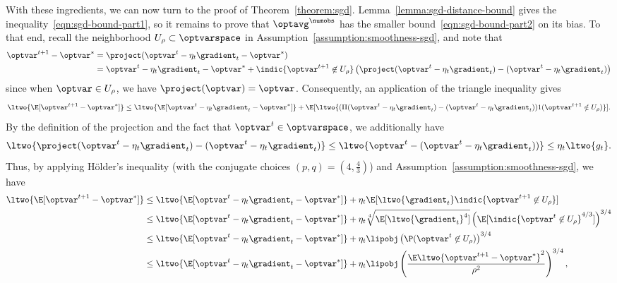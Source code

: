 \documentclass[11pt,twoside]{article}
\theoremstyle{definition}
\begin{document}
\vspace*{.1in}

With these ingredients, we can now turn to the proof of
Theorem~\ref{theorem:sgd}.  Lemma~\ref{lemma:sgd-distance-bound} gives
the inequality~\eqref{eqn:sgd-bound-part1}, so it remains to prove
that $\optavg^\numobs$ has the smaller
bound~\eqref{eqn:sgd-bound-part2} on its bias. To that end, recall the
neighborhood $U_\rho \subset \optvarspace$ in
Assumption~\ref{assumption:smoothness-sgd}, and note that
\begin{align*}
  \optvar^{t + 1} - \optvar^*
  & = \project(\optvar^t - \eta_t \gradient_t - \optvar^*) \\
  & = \optvar^t - \eta_t \gradient_t - \optvar^*
  + \indic{\optvar^{t+1} \not\in U_\rho}
  \left(\project(\optvar^t - \eta_t \gradient_t)
  - (\optvar^t - \eta_t \gradient_t)\right)
\end{align*}
since when $\optvar \in U_\rho$, we have $\project(\optvar) = \optvar$.
Consequently, an application of the triangle inequality gives
\begin{equation*}
  \ltwo{\E[\optvar^{t+1}-\optvar^*]}
  \leq \ltwo{\E[\optvar^{t}-\eta_t\gradient_t-\optvar^*]}
  + \E[\ltwo{(\Pi(\optvar^{t}-\eta_t\gradient_t)
      -(\optvar^{t}-\eta_t\gradient_t))1(\optvar^{t+1}\notin U_\rho)}].
\end{equation*}
By the definition of the projection and the fact that $\optvar^t \in
\optvarspace$, we additionally have
\begin{equation*}
  \ltwo{\project(\optvar^{t}-\eta_t\gradient_t)
    -(\optvar^{t}-\eta_t\gradient_t)}
  \le \ltwo{\optvar^{t}-(\optvar^{t}-\eta_t\gradient_t))}
  \le \eta_t \ltwo{g_t}.
\end{equation*}
Thus, by applying H\"older's inequality (with the
conjugate choices $(p, q) = (4, \frac{4}{3})$) and
Assumption~\ref{assumption:smoothness-sgd}, we have
\begin{align}
  \ltwo{\E[\optvar^{t+1}-\optvar^*]}
  & \le \ltwo{\E[\optvar^{t}-\eta_t\gradient_t-\optvar^*]}
  + \eta_t \E[\ltwo{\gradient_t} \indic{\optvar^{t + 1} \not\in U_\rho}]
  \nonumber \\
  & \le \ltwo{\E[\optvar^{t}-\eta_t\gradient_t-\optvar^*]}
  + \eta_t \sqrt[4]{\E[\ltwo{\gradient_t}^4]}
  \left(\E[\indic{\optvar^t \not\in U_\rho}^{4/3}]\right)^{3/4}
  \nonumber \\
  & \le \ltwo{\E[\optvar^{t}-\eta_t\gradient_t-\optvar^*]}
  + \eta_t \lipobj
  \left(\P(\optvar^t \not\in U_\rho)\right)^{3/4}
  \nonumber \\
  & \le \ltwo{\E[\optvar^{t}-\eta_t\gradient_t-\optvar^*]}
  + \eta_t \lipobj
  \left(\frac{\E\ltwo{\optvar^{t+1}-\optvar^*}^2}{\rho^2}\right)^{3/4},
  \label{eqn:sgd-tplusone-truncation}
\end{align}
\end{document}
